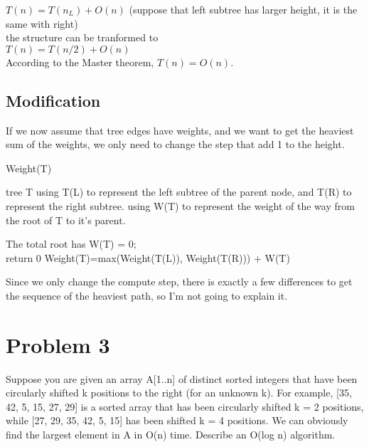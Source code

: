 \documentclass[]{article}
\begin{document}
	$T(n) = T(n_{L}) + O(n)$ (suppose that left subtree has larger height, it is the same with right)\\
	
	\noindent the structure can be tranformed to\\
	
	$T(n) = T(n/2) + O(n)$  \\
	
	\noindent According to the Master theorem, $T(n)=O(n)$. \\
	
	\subsection{Modification}
	
	If we now assume that tree edges have weights, and we want to get the heaviest sum of the weights, we only need to change the step that add 1 to the height. \\
	
	\begin{algorithm}  
		\caption{Weight(T)}  
		\begin{algorithmic} 
			\Require tree T 
			\Ensure
			\State using T(L) to represent the left subtree of the parent node, and T(R) to represent the right subtree. 
			\State using W(T) to represent the weight of the way from the root of T to it's parent. 
			
			\State The total root has W(T) = 0;\\
			
			\State return 0
			\Else
			\State Weight(T)=max(Weight(T(L)), Weight(T(R))) + W(T)
			\EndIf \\
		\end{algorithmic}  
	\end{algorithm} 
	
	\noindent Since we only change the compute step, there is exactly a few differences to get the sequence of the heaviest path, so I'm not going to explain it.
	
	\clearpage
	
	\section{Problem 3}
	Suppose you are given an array A[1..n] of distinct sorted integers that have been circularly shifted k positions to the right (for an unknown k). For example, [35, 42, 5, 15, 27, 29] is a sorted array that has been circularly shifted k = 2 positions, while [27, 29, 35, 42, 5, 15] has been shifted k = 4 positions. We can obviously find the largest element in A in O(n) time. Describe an O(log n) algorithm.
\end{document}
